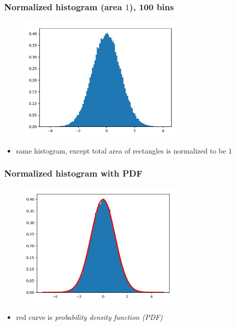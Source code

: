 \documentclass[english,14pt]{beamer}
\newcommand\red[1]{{\color{red} #1}}
\begin{document}

\begin{frame}[fragile]

\frametitle{Normalized histogram (area $1$), 100 bins}

\begin{figure}[ht]
	\centering
	\includegraphics[width=0.7\textwidth]{figures/hist100BinsDensity}
\end{figure}

\vspace*{-5mm}

\begin{itemize}
	\item same histogram, except total area of rectangles is normalized to be $1$
\end{itemize}

\end{frame}


\begin{frame}[fragile]

\frametitle{Normalized histogram with PDF}

\begin{figure}[ht]
	\centering
	\includegraphics[width=0.7\textwidth]{figures/histWithpdf}
\end{figure}

\vspace*{-5mm}

\begin{itemize}
	\item[] red curve is \red{\emph{probability density function (PDF)}}
\end{itemize}

\end{frame}
\end{document}
